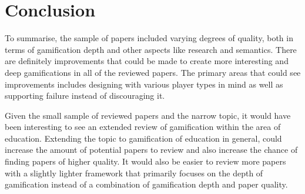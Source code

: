 \section{Conclusion}
To summarise, the sample of papers included varying degrees of quality, both in terms of gamification depth and other aspects like research and semantics. There are definitely improvements that could be made to create more interesting and deep gamifications in all of the reviewed papers. The primary areas that could see improvements includes designing with various player types in mind as well as supporting failure instead of discouraging it.  

Given the small sample of reviewed papers and the narrow topic, it would have been interesting to see an extended review of gamification within the area of education. Extending the topic to gamification of education in general, could increase the amount of potential papers to review and also increase the chance of finding papers of higher quality. It would also be easier to review more papers with a slightly lighter framework that primarily focuses on the depth of gamification instead of a combination of gamification depth and paper quality. 